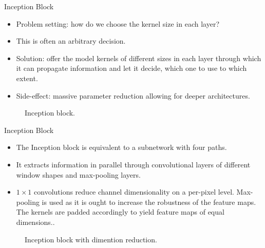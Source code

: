 \begin{vbframe}{Inception Block}
    \begin{itemize}
        \item Problem setting: how do we choose the kernel size in each layer? 
        \item This is often an arbitrary decision.
        \item Solution: offer the model kernels of different sizes in each layer through which it can propagate information and let it decide, which one to use to which extent.
        \item Side-effect: massive parameter reduction allowing for deeper architectures.
    \end{itemize}
    
      \begin{figure}
    \centering
    \caption{Inception block.}
  \end{figure}
    
\end{vbframe}
         
         
\begin{vbframe}{Inception Block}
    \begin{itemize}
        \item The Inception block is equivalent to a subnetwork with four paths. 
        \item It extracts information in parallel through convolutional layers of different window shapes and max-pooling layers.  
        \item $1 \times 1$ convolutions reduce channel dimensionality on a per-pixel level. Max-pooling is used as it is ought to increase the robustness of the feature maps. The kernels are padded accordingly to yield feature maps of equal dimensions..
    \end{itemize}
    
    
  \begin{figure}
    \centering
    \caption{Inception block with dimention reduction.}
  \end{figure}
\end{vbframe}




